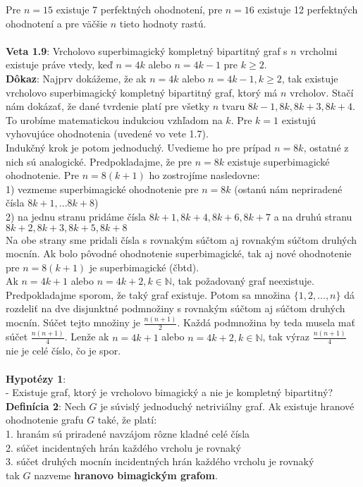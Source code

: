 \documentclass[12pt]{article}
\begin{document}
Pre $n = 15$ existuje 7 perfektných ohodnotení, pre $n = 16$ existuje 12 perfektných ohodnotení a pre väčšie $n$ tieto hodnoty rastú. \\\\

\textbf{Veta 1.9}: Vrcholovo superbimagický kompletný bipartitný graf s $n$ vrcholmi existuje práve vtedy, keď $n = 4k$ alebo $n = 4k-1$ pre $k \geq 2$. \\

\textbf{Dôkaz}: Najprv dokážeme, že ak $n = 4k$ alebo $n = 4k-1, k \geq 2$, tak existuje vrcholovo superbimagický kompletný bipartitný graf, ktorý má $n$ vrcholov. Stačí nám dokázať, že dané tvrdenie platí pre všetky $n$ tvaru $8k-1, 8k, 8k+3, 8k+4$. To urobíme matematickou indukciou vzhľadom na $k$. Pre $k = 1$ existujú vyhovujúce ohodnotenia (uvedené vo vete 1.7). \\

Indukčný krok je potom jednoduchý. Uvedieme ho pre prípad $n = 8k$, ostatné z nich sú analogické. Predpokladajme, že pre $n = 8k$ existuje superbimagické ohodnotenie. Pre $n = 8(k+1)$ ho zostrojíme nasledovne: \\
1) vezmeme superbimagické ohodnotenie pre $n = 8k$ (ostanú nám nepriradené čísla $8k+1, ... 8k+8$) \\
2) na jednu stranu pridáme čísla $8k+1, 8k+4, 8k+6, 8k+7$ a na druhú stranu $8k+2, 8k+3, 8k+5, 8k+8$ \\
Na obe strany sme pridali čísla s rovnakým súčtom aj rovnakým súčtom druhých mocnín. Ak bolo pôvodné ohodnotenie superbimagické, tak aj nové ohodnotenie pre $n = 8(k+1)$ je superbimagické (čbtd). \\

Ak $n = 4k+1$ alebo $n = 4k+2, k \in \mathbb{N}$, tak požadovaný graf neexistuje. Predpokladajme sporom, že taký graf existuje. Potom sa množina $\{1, 2, ... , n\}$ dá rozdeliť na dve disjunktné podmnožiny s rovnakým súčtom aj súčtom druhých mocnín. Súčet tejto množiny je $\frac{n(n+1)}{2}$. Každá podmnožina by teda musela mať súčet $\frac{n(n+1)}{4}$. Lenže ak  $n = 4k+1$ alebo $n = 4k+2, k \in \mathbb{N}$, tak výraz $\frac{n(n+1)}{4}$ nie je celé číslo, čo je spor. \\\\

\textbf{Hypotézy 1}: \\
- Existuje graf, ktorý je vrcholovo bimagický a nie je kompletný bipartitný? \\

\textbf{Definícia 2}: Nech $G$ je súvislý jednoduchý netriviálny graf. Ak existuje hranové ohodnotenie grafu $G$ také, že platí: \\
1. hranám sú priradené navzájom rôzne kladné celé čísla \\
2. súčet incidentných hrán každého vrcholu je rovnaký \\
3. súčet druhých mocnín incidentných hrán každého vrcholu je rovnaký \\
tak $G$ nazveme \textbf{hranovo bimagickým grafom}. \\
\end{document}
